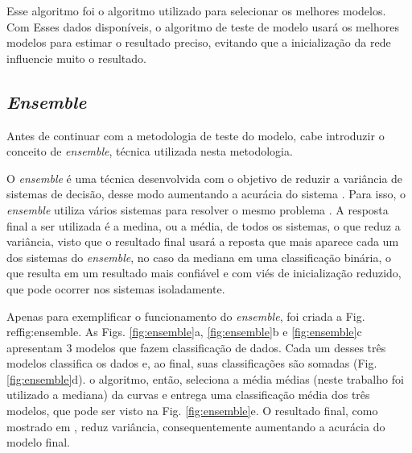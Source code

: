 Esse algoritmo foi o algoritmo utilizado para selecionar os melhores modelos. Com Esses dados disponíveis, o algoritmo de teste de modelo usará os melhores modelos para estimar o resultado preciso, evitando que a inicialização da rede influencie muito o resultado.

\subsection{\textit{Ensemble}}

Antes de continuar com a metodologia de teste do modelo, cabe introduzir o conceito de \textit{ensemble}, técnica utilizada nesta metodologia.

O \textit{ensemble} é uma técnica desenvolvida com o objetivo de reduzir a variância de sistemas de decisão, desse modo aumentando a acurácia do sistema \cite{opitz1999popular}. Para isso, o \textit{ensemble} utiliza vários sistemas para resolver o mesmo problema \cite{opitz1999popular, dietterich2000ensemble, tan2003ensemble, kotsiantis2007supervised, dietterich2000experimental, zhang2012ensemble}. A resposta final a ser utilizada é a medina, ou a média, de todos os sistemas, o que reduz a variância, visto que o resultado final usará a reposta que mais aparece cada um dos sistemas do \textit{ensemble}, no caso da mediana em uma classificação binária, o que resulta em um resultado mais confiável e com viés de inicialização reduzido, que pode ocorrer nos sistemas isoladamente.

Apenas para exemplificar o funcionamento do \textit{ensemble}, foi criada a Fig. \\ref{fig:ensemble}. As Figs. \ref{fig:ensemble}a, \ref{fig:ensemble}b e \ref{fig:ensemble}c apresentam 3 modelos que fazem classificação de dados. Cada um desses três modelos classifica os dados e, ao final, suas classificações são somadas (Fig. \ref{fig:ensemble}d). o algoritmo, então, seleciona a média médias (neste trabalho foi utilizado a mediana) da curvas e entrega uma classificação média dos três modelos, que pode ser visto na Fig. \ref{fig:ensemble}e. O resultado final, como mostrado em \cite{opitz1999popular}, reduz variância, consequentemente aumentando a acurácia do modelo final.



